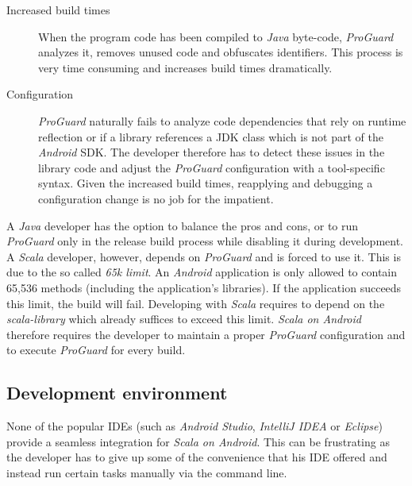 \begin{description}

	\item[Increased build times]\hfill

	When the program code has been compiled to \textit{Java} byte-code, \textit{ProGuard} analyzes it, removes unused code and obfuscates identifiers. This process is very time consuming and increases build times dramatically.

	\item[Configuration]\hfill

	\textit{ProGuard} naturally fails to analyze code dependencies that rely on runtime reflection or if a library references a \ac{JDK} class which is not part of the \textit{Android} \ac{SDK}. The developer therefore has to detect these issues in the library code and adjust the \textit{ProGuard} configuration with a tool-specific syntax. Given the increased build times, reapplying and debugging a configuration change is no job for the impatient.

\end{description}

A \textit{Java} developer has the option to balance the pros and cons, or to run \textit{ProGuard} only in the release build process while disabling it during development. A \textit{Scala} developer, however, depends on \textit{ProGuard} and is forced to use it. This is due to the so called \textit{65k limit}. An \textit{Android} application is only allowed to contain 65,536 methods (including the application's libraries). If the application succeeds this limit, the build will fail. Developing with \textit{Scala} requires to depend on the \textit{scala-library} which already suffices to exceed this limit. \textit{Scala on Android} therefore requires the developer to maintain a proper \textit{ProGuard} configuration and to execute \textit{ProGuard} for every build.

\subsection{Development environment}

None of the popular \acp{IDE} (such as \textit{Android Studio}, \textit{IntelliJ IDEA} or \textit{Eclipse}) provide a seamless integration for \textit{Scala on Android}. This can be frustrating as the developer has to give up some of the convenience that his \ac{IDE} offered and instead run certain tasks manually via the command line.